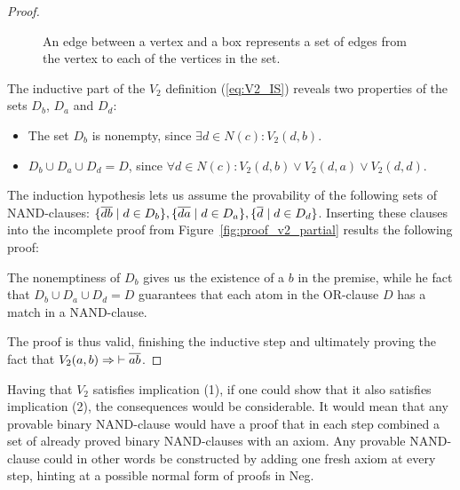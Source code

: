 \begin{proof}
\begin{figure}[!h]
{    An edge between a vertex and a box represents a set of edges from the vertex to each of the vertices in the set.}
    \label{fig:v2_situation}
  \end{figure}
  \FloatBarrier
  The inductive part of the $V_2$ definition (\ref{eq:V2_IS}) reveals two properties of the sets $D_b$, $D_a$ and $D_d$:
  \begin{itemize}
    \item The set $D_b$ is nonempty, since $\exists d \in N(c): V_2(d,b)$.
    \item $D_b \cup D_a \cup D_d = D$, since $\forall d \in N(c): V_2(d,b) \vee V_2(d,a) \vee V_2(d,d)$.
  \end{itemize}
  The induction hypothesis lets us assume the provability of the following sets of NAND-clauses:
  $\{ \ol{db} \;|\; d \in D_b \},\{ \ol{da} \;|\; d \in D_a \},\{ \ol{d} \;|\; d \in D_d \}$.
  Inserting these clauses into the incomplete proof from Figure~\ref{fig:proof_v2_partial} results the following proof:\par
  \begin{figure}[!h]
    \centering
    \begin{prooftree*}
    \end{prooftree*}
    \caption{}
    \label{fig:proof_v2}
  \end{figure}
  The nonemptiness of $D_b$ gives us the existence of a $b$ in the premise, while he fact that $D_b \cup D_a \cup D_d = D$ guarantees that each atom in the OR-clause $D$ has a match in a NAND-clause.

  The proof is thus valid, finishing the inductive step and ultimately proving the fact that $V_2(a,b) \Rightarrow \;\vdash \ol{ab}$.
\end{proof}
Having that $V_2$ satisfies implication (1), if one could show that it also satisfies implication (2), the consequences would be considerable.
It would mean that any provable binary NAND-clause would have a proof that in each step combined a set of already proved binary NAND-clauses with an axiom.
Any provable NAND-clause could in other words be constructed by adding one fresh axiom at every step, hinting at a possible normal form of proofs in Neg.

